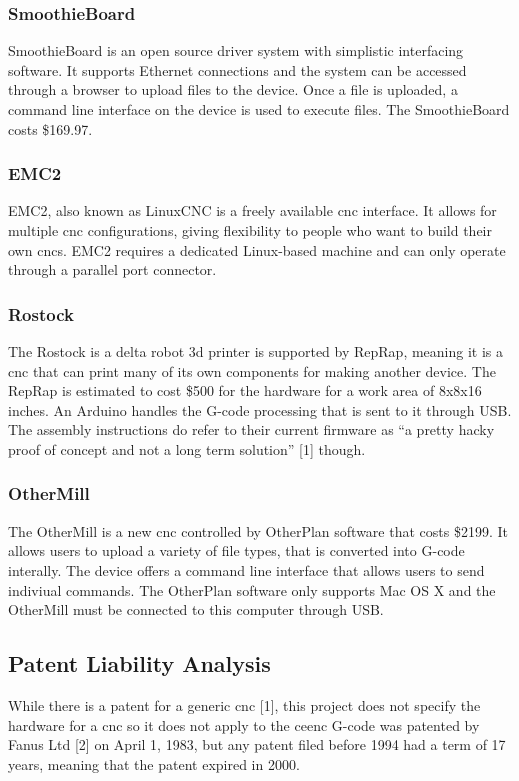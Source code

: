 \subsubsection{SmoothieBoard}
SmoothieBoard is an open source driver system with simplistic interfacing software.
It supports Ethernet connections and the system can be accessed through a browser to upload files to the device.
Once a file is uploaded, a command line interface on the device is used to execute files.
The SmoothieBoard costs \$169.97.

\subsubsection{EMC2}
EMC2, also known as LinuxCNC is a freely available \gls{cnc} interface.
It allows for multiple \gls{cnc} configurations, giving flexibility to people who want to build their own \gls{cnc}s.
EMC2 requires a dedicated Linux-based machine and can only operate through a parallel port connector.

\subsubsection{Rostock}
The Rostock is a delta robot \gls{3d} printer is supported by RepRap, meaning it is a \gls{cnc} that can print many of its own components for making another device. 
The RepRap is estimated to cost \$500 for the hardware for a work area of 8x8x16 inches.
An Arduino handles the G-code processing that is sent to it through USB.
The assembly instructions do refer to their current firmware as “a pretty hacky proof of concept and not a long term solution” [1] though.

\subsubsection{OtherMill}
The OtherMill is a new \gls{cnc} controlled by OtherPlan software that costs \$2199.
It allows users to upload a variety of file types, that is converted into G-code interally.
The device offers a command line interface that allows users to send indiviual commands.
The OtherPlan software only supports Mac OS X and the OtherMill must be connected to this computer through USB.

\subsection{Patent Liability Analysis}
While there is a patent for a generic \gls{cnc} [1], this project does not specify the hardware for a \gls{cnc} so it does not apply to the \gls{ceenc}
G-code was patented by Fanus Ltd [2] on April 1, 1983, but any patent filed before 1994 had a term of 17 years, meaning that the patent expired in 2000.


